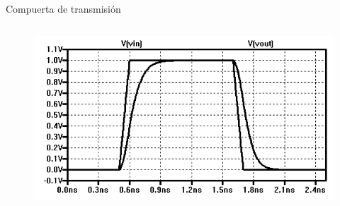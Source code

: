 \documentclass[aspectratio=169,t]{beamer}
\begin{document}
\begin{frame}{Compuerta de transmisión}
\begin{columns}
\begin{column}{0.7\textwidth}

\begin{figure}
    \centering
    \includegraphics[width=\textwidth]{figuras/transmission_gate_3.png}
\end{figure}

\end{column}
    
\end{columns}

\end{frame}
\end{document}
